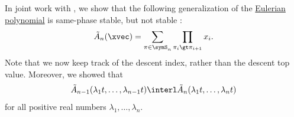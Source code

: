 \begin{example*}
In joint work with , we show that the following
generalization of the \hyperref[eulerianPolynomial]{Eulerian polynomial} is
same-phase stable, but not stable \cite{AlexanderssonNabawanda2021}:
\[
 \tilde{A}_n(\xvec) = \sum_{\pi \in \symS_n} \prod_{\pi_i \gt \pi_{i+1}} x_{i}.
\]
Note that we now keep track of the descent index, rather than the descent
top value.
Moreover, we showed that
\[
 \tilde{A}_{n-1}(\lambda_1 t, \dotsc, \lambda_{n-1} t)
 \interl
 \tilde{A}_n(\lambda_1 t, \dotsc, \lambda_n t)
\]
for all positive real numbers $\lambda_1,\dotsc,\lambda_n$.
\end{example*}
